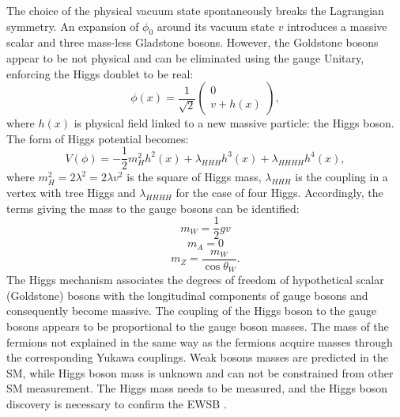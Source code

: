 The choice of the physical vacuum state spontaneously breaks the Lagrangian symmetry. An expansion of $\phi_0$ around its vacuum state $v$ introduces a massive scalar and three mass-less Gladstone bosons. However, the Goldstone bosons appear to be not physical and can be eliminated using the gauge Unitary, enforcing the Higgs doublet to be real:
\begin{equation}
    \phi(x)=\frac{1}{\sqrt{2}}\left(\begin{array}{c}
0 \\
v+h(x)
\end{array}\right),
\end{equation}
where $h(x)$ is physical field linked to a new massive particle: the Higgs boson. The form of Higgs potential becomes: \begin{equation}
    V(\phi)=-\frac{1}{2} m_{H}^{2} h^{2}(x)+\lambda_{H H H} h^{3}(x)+\lambda_{H H H H} h^{4}(x),
\end{equation}
where $m_{H}^{2}=2 \lambda^{2}=2 \lambda v^{2}$ is the square of Higgs mass, $\lambda_{HHH}$ is the coupling in a vertex with tree Higgs and $\lambda_{HHHH}$ for the case of four Higgs.
Accordingly, the terms giving the mass to the gauge bosons can be identified:
\begin{equation}
m_{W} = \frac{1}{2}gv 
\end{equation}
\begin{equation}
m_{A} = 0    
\end{equation}
\begin{equation}
m_{Z} = \frac{m_{W}}{\cos\theta_{W}}.
\end{equation}
The Higgs mechanism associates the degrees of freedom of hypothetical scalar (Goldstone) bosons with the longitudinal components of gauge bosons and consequently become massive. The coupling of the Higgs boson to the gauge bosons appears to be proportional to the gauge boson masses. The mass of the fermions not explained in the same way as the fermions acquire masses through the corresponding Yukawa couplings. Weak bosons masses are predicted in the SM, while Higgs boson mass is unknown and can not be constrained from other SM measurement. The Higgs mass needs to be measured, and the Higgs boson discovery is necessary to confirm the EWSB \cite{EWSB}.
